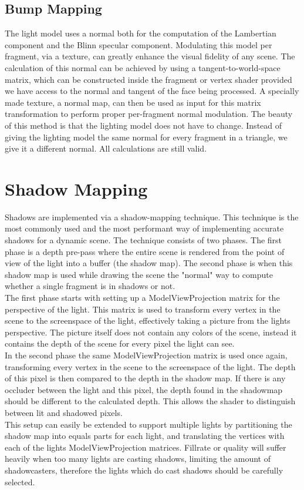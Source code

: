 \subsection{Bump Mapping}
The light model uses a normal both for the computation of the Lambertian component and the Blinn specular component. Modulating this model per fragment, via a texture, can greatly enhance the visual fidelity of any scene. The calculation of this normal can be achieved by using a tangent-to-world-space matrix, which can be constructed inside the fragment or vertex shader provided we have access to the normal and tangent of the face being processed. A specially made texture, a normal map, can then be used as input for this matrix transformation to perform proper per-fragment normal modulation. The beauty of this method is that the lighting model does not have to change. Instead of giving the lighting model the same normal for every fragment in a triangle, we give it a different normal. All calculations are still valid.

\section{Shadow Mapping}
Shadows are implemented via a shadow-mapping technique. This technique is the most commonly used and the most performant way of implementing accurate shadows for a dynamic scene. The technique consists of two phases. The first phase is  a depth pre-pass where the entire scene is rendered from the point of view of the light into a buffer (the shadow map). The second phase is when this shadow map is used while drawing the scene the "normal" way to compute whether a single fragment is in shadows or not.\\
The first phase starts with setting up a ModelViewProjection matrix for the perspective of the light. This matrix is used to transform every vertex in the scene to the screenspace of the light, effectively taking a picture from the lights perspective. The picture itself does not contain any colors of the scene, instead it contains the depth of the scene for every pixel the light can see.\\
In the second phase the same ModelViewProjection matrix is used once again, transforming every vertex in the scene to the screenspace of the light. The depth of this pixel is then compared to the depth in the shadow map. If there is any occluder between the light and this pixel, the depth found in the shadowmap should be different to the calculated depth. This allows the shader to distinguish between lit and shadowed pixels. \\
This setup can easily be extended to support multiple lights by partitioning the shadow map into equals parts for each light, and translating the vertices with each of the lights ModelViewProjection matrices. Fillrate or quality will suffer heavily when too many lights are casting shadows, limiting the amount of shadowcasters, therefore the lights which do cast shadows should be carefully selected.

